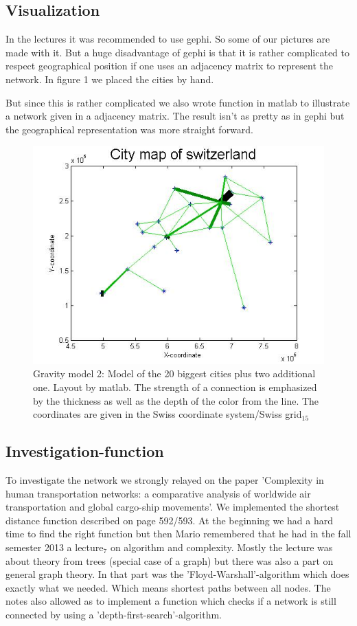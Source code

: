 \documentclass[11pt]{article}
\begin{document}
\subsection{Visualization}
In the lectures it was recommended to use gephi. So some of our pictures are made with it. But a huge disadvantage of gephi is that it is rather complicated to respect geographical position if one uses an adjacency  matrix to represent the network. In figure 1 we placed the cities by hand.

But since this is rather complicated we also wrote function in matlab to illustrate a network given in a adjacency matrix. The result isn't as pretty as in gephi but the geographical representation was more straight forward.


\begin{figure}
\centering
\includegraphics[scale=0.5]{switzerland_network2}
 \caption{Gravity model 2: Model of the 20 biggest cities plus two additional one. Layout by matlab. The strength of a connection is emphasized by the thickness as well as the depth of the color from the line. The coordinates are given in the Swiss coordinate system/Swiss grid$_{15}$}
\end{figure}

\subsection{Investigation-function}
To investigate the network we strongly relayed on the paper 'Complexity in human transportation networks: a comparative analysis of worldwide air transportation and global cargo-ship movements'.
We implemented the shortest distance function described on page 592/593. At the beginning we had a hard time to find the right function but then Mario remembered that he had in the fall semester 2013 a lecture$_{7}$ on algorithm and complexity. Mostly the lecture was about theory from trees (special case of a graph) but there was also a part on general graph theory. In that part was the 'Floyd-Warshall'-algorithm which does exactly what we needed. Which means shortest paths between all nodes.
The notes also allowed as to implement a function which checks if a network is still connected by using a 'depth-first-search'-algorithm.
\end{document}
